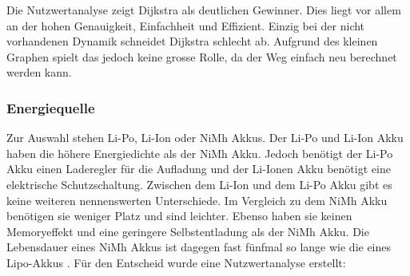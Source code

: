 \documentclass[../main.tex]{subfiles}
\begin{document}
Die Nutzwertanalyse zeigt Dijkstra als deutlichen Gewinner. Dies liegt vor allem an der hohen Genauigkeit, Einfachheit und Effizient. Einzig bei der nicht vorhandenen Dynamik schneidet Dijkstra schlecht ab. Aufgrund des kleinen Graphen spielt das jedoch keine grosse Rolle, da der Weg einfach neu berechnet werden kann.

\newpage

\subsubsection{Energiequelle}
\label{a3:Energiequelle}
Zur Auswahl stehen Li-Po, Li-Ion oder NiMh Akkus. Der Li-Po und Li-Ion Akku haben die höhere Energiedichte als der NiMh Akku. Jedoch benötigt der Li-Po Akku einen Laderegler für die Aufladung und der Li-Ionen Akku benötigt eine elektrische Schutzschaltung. Zwischen dem Li-Ion und dem Li-Po Akku gibt es keine weiteren nennenswerten Unterschiede. 
Im Vergleich zu dem NiMh Akku benötigen sie weniger Platz und sind leichter. Ebenso haben sie keinen Memoryeffekt und eine geringere Selbstentladung als der NiMh Akku. Die Lebensdauer eines NiMh Akkus ist dagegen fast fünfmal so lange wie die eines Lipo-Akkus \cite{nimh_vs_lipo_rcteam}. Für den Entscheid wurde eine Nutzwertanalyse erstellt:


\begin{table}[H]
            \caption{Nutzwertanalyse Akku}
            \label{tab:konzept_Akku}
        \end{table}
        
\end{document}
